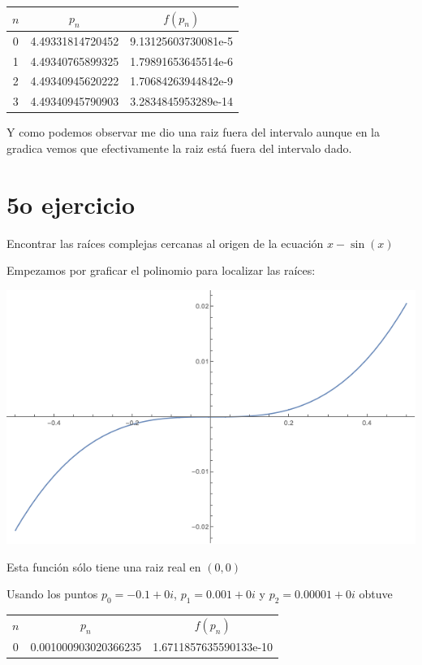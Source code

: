 \documentclass{article}
\begin{document}
\begin{center}
    \begin{tabular}{||c c c||} 
    \hline
    $n$ & $p_{n}$ & $f(p_n)$ \\ [0.5ex] 
    \hline
    0 & 4.49331814720452 & 9.13125603730081e-5 \\
    \hline
    1 & 4.49340765899325 & 1.79891653645514e-6\\
    \hline
    2 & 4.49340945620222 & 1.70684263944842e-9 \\
    \hline
    3 & 4.49340945790903 & 3.2834845953289e-14 \\ [1ex]
    \hline
   \end{tabular}
\end{center}

Y como podemos observar me dio una raiz fuera del intervalo aunque en la gradica vemos que efectivamente la raiz está fuera del intervalo dado.

\section{5o ejercicio}
Encontrar las raíces complejas cercanas al origen de la ecuación $x - \sin(x)$

Empezamos por graficar el polinomio para localizar las raíces:
\begin{center}
    \includegraphics[scale=0.5]{graficaSin.png}    
\end{center}

Esta función sólo tiene una raiz real en $(0,0)$

Usando los puntos $p_0 = -0.1 + 0i$, $p_1 =0.001 + 0i$ y $p_2 = 0.00001 + 0i$ obtuve

\begin{center}
    \begin{tabular}{||c c c||} 
    \hline
    $n$ & $p_{n}$ & $f(p_n)$ \\ [0.5ex] 
    0 & 0.001000903020366235  & 1.6711857635590133e-10 \\ [1ex]
    \hline
   \end{tabular}
\end{center}
\end{document}
